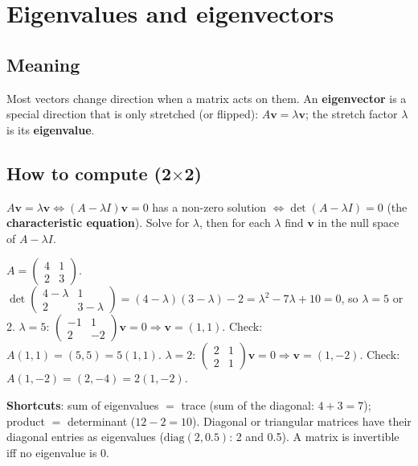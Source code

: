 \section{Eigenvalues and eigenvectors}
\subsection{Meaning}
Most vectors change direction when a matrix acts on them. An \textbf{eigenvector} is a special direction that is only stretched (or flipped): $A\mathbf v = \lambda\mathbf v$; the
stretch factor $\lambda$ is its \textbf{eigenvalue}.

\subsection{How to compute (2$\times$2)}
$A\mathbf v = \lambda\mathbf v\iff(A - \lambda I)\mathbf v = 0$ has a non-zero solution $\iff\det(A - \lambda I) = 0$ (the \textbf{characteristic equation}). Solve for $\lambda$,
then for each $\lambda$ find $\mathbf v$ in the null space of $A - \lambda I$.
\begin{example}
$A = \begin{pmatrix}4 & 1\\2 & 3\end{pmatrix}$. $\det\begin{pmatrix}4 - \lambda & 1\\2 & 3 - \lambda\end{pmatrix} = (4 - \lambda)(3 - \lambda) - 2 = \lambda^2 - 7\lambda + 10 = 0$,
so $\lambda = 5$ or 2.
$\lambda = 5$: $\begin{pmatrix}-1 & 1\\2 & -2\end{pmatrix}\mathbf v = 0\Rightarrow\mathbf v = (1,1)$. Check: $A(1,1) = (5,5) = 5(1,1)$.
$\lambda = 2$: $\begin{pmatrix}2 & 1\\2 & 1\end{pmatrix}\mathbf v = 0\Rightarrow\mathbf v = (1,-2)$. Check: $A(1,-2) = (2,-4) = 2(1,-2)$.
\end{example}
\textbf{Shortcuts}: sum of eigenvalues $=$ trace (sum of the diagonal: $4 + 3 = 7$); product $=$ determinant ($12 - 2 = 10$). Diagonal or triangular matrices have their diagonal
entries as eigenvalues ($\text{diag}(2, 0.5)$: 2 and 0.5). A matrix is invertible iff no eigenvalue is 0.

